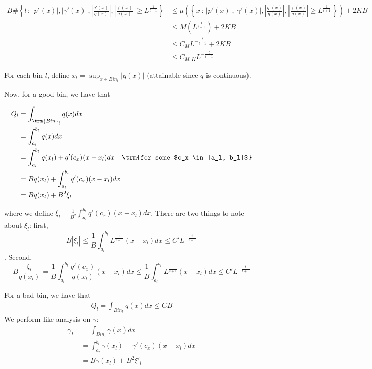 \documentclass{article}
\begin{document}
\begin{align*}
B \# \left \{ l \,:\, |p'(x)|, |\gamma'(x)|, |\frac{q'(x)}{q(x)}|, 
                |\frac{\gamma'(x)}{q(x)}|   
           \geq L^{\frac{1}{t+1}} \right \} &\leq 
   \mu \left( \left\{x \,:\, |p'(x)|, |\gamma'(x)|, |\frac{q'(x)}{q(x)}|, 
                |\frac{\gamma'(x)}{q(x)}|  
         \geq L^{\frac{1}{t+1}} \right\} \right) + 2KB \\
  &\leq M( L^{\frac{1}{t+1}} ) + 2KB \\
  &\leq C_M L^{ - \frac{t}{t+1}} + 2 K B \\
  & \leq C_{M, K} L^{ - \frac{t}{t+1}}
\end{align*}

For each bin $l$, define $x_l = \sup_{x \in Bin_l} | q(x) |$ (attainable since $q$ is continuous).

Now, for a good bin, we have that 

\begin{align*}
Q_l &= \int_{\trm{Bin}_l} q(x) dx \\
  &= \int_{a_l}^{b_l} q(x) dx \\
 &= \int_{a_l}^{b_l} q(x_l) + q'(c_x) (x - x_l) dx \quad \trm{for some $c_x \in [a_l, b_l]$}\\
 &= B q(x_l) + \int_{a_l}^{b_l} q'(c_x)(x-x_l) dx  \\
 &= B q(x_l) + B^2 \xi_l \\
\end{align*}

where we define $\xi_l = \frac{1}{B^2} \int_{a_l}^{b_l} q'(c_x) (x-x_l) dx$. There are two things to note about $\xi_l$: first, 
$$B |\xi_l| \leq \frac{1}{B} \int_{a_l}^{b_l} L^{\frac{1}{t+1}} (x-x_l) dx \leq C' L^{- \frac{t}{t+1}}$$.
Second, 
$$B \frac{\xi_l}{q(x_l)} = \frac{1}{B} \int_{a_l}^{b_l} \frac{q'(c_x)}{q(x_l)} (x - x_l)dx 
                \leq \frac{1}{B} \int_{a_l}^{b_l} L^{\frac{1}{t+1}} (x - x_l) dx \leq 
 C' L^{- \frac{t}{t+1}} $$ 


For a bad bin, we have that
\begin{align*}
Q_l = \int_{Bin_l} q(x) dx \leq C B
\end{align*}
We perform like analysis on $\gamma$:
\begin{align*}
\gamma_L &= \int_{Bin_l} \gamma(x) dx \\
     &=  \int_{a_l}^{b_l} \gamma(x_l) + \gamma'(c_x) (x - x_l) dx  \\
     &= B \gamma(x_l) + B^2 \xi'_l
\end{align*}  
\end{document}
